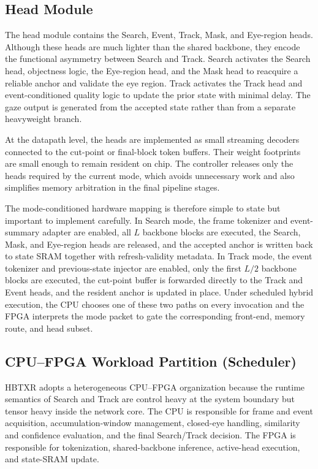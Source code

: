\documentclass[journal]{IEEEtran}
\begin{document}
\subsection{Head Module}
The head module contains the Search, Event, Track, Mask, and Eye-region heads. Although these heads are much lighter than the shared backbone, they encode the functional asymmetry between Search and Track. Search activates the Search head, objectness logic, the Eye-region head, and the Mask head to reacquire a reliable anchor and validate the eye region. Track activates the Track head and event-conditioned quality logic to update the prior state with minimal delay. The gaze output is generated from the accepted state rather than from a separate heavyweight branch.

At the datapath level, the heads are implemented as small streaming decoders connected to the cut-point or final-block token buffers. Their weight footprints are small enough to remain resident on chip. The controller releases only the heads required by the current mode, which avoids unnecessary work and also simplifies memory arbitration in the final pipeline stages.

The mode-conditioned hardware mapping is therefore simple to state but important to implement carefully. In Search mode, the frame tokenizer and event-summary adapter are enabled, all $L$ backbone blocks are executed, the Search, Mask, and Eye-region heads are released, and the accepted anchor is written back to state SRAM together with refresh-validity metadata. In Track mode, the event tokenizer and previous-state injector are enabled, only the first $L/2$ backbone blocks are executed, the cut-point buffer is forwarded directly to the Track and Event heads, and the resident anchor is updated in place. Under scheduled hybrid execution, the CPU chooses one of these two paths on every invocation and the FPGA interprets the mode packet to gate the corresponding front-end, memory route, and head subset.

\subsection{CPU--FPGA Workload Partition (Scheduler)}
HBTXR adopts a heterogeneous CPU--FPGA organization because the runtime semantics of Search and Track are control heavy at the system boundary but tensor heavy inside the network core. The CPU is responsible for frame and event acquisition, accumulation-window management, closed-eye handling, similarity and confidence evaluation, and the final Search/Track decision. The FPGA is responsible for tokenization, shared-backbone inference, active-head execution, and state-SRAM update.
\end{document}
